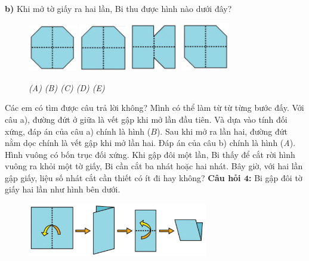 \textbf{\color{toancuabi}b)} Khi mở tờ giấy ra hai lần, Bi thu được hình nào dưới đây?
\begin{figure}[H]
	\centering
	\captionsetup{labelformat=empty}
	\vspace*{-5pt}
	\captionsetup{justification=centering}
	\includegraphics[width =0.19\textwidth]{cat-9a}
	\hfill
	\includegraphics[width =0.19\textwidth]{cat-9b}
	\hfill
	\includegraphics[width =0.19\textwidth]{cat-9c}
	\hfill
	\includegraphics[width =0.19\textwidth]{cat-9d}
	\caption{\small \it (A) \hfill (B) \hfill (C) \hfill (D) \hfill (E)}
\end{figure}
Các em có tìm được câu trả lời không? Mình có thể làm từ từ từng bước đấy. Với câu a), đường đứt ở giữa là vết gập khi mở lần đầu tiên. Và dựa vào tính đối xứng, đáp án của câu a) chính là hình ($B$).
\vskip 0.1cm
Sau khi mở ra lần hai, đường đứt nằm dọc chính là vết gập khi mở lần hai. Đáp án của câu b) chính là hình (\textit{A}).
\vskip 0.1cm
Hình vuông có bốn trục đối xứng. Khi gập đôi một lần, Bi thấy để cắt rời hình vuông ra khỏi một tờ giấy, Bi cần cắt ba nhát hoặc hai nhát. Bây giờ, với hai lần gập giấy, liệu số nhát cắt cần thiết có ít đi hay không?
\vskip 0.1cm
\textbf{\color{toancuabi}Câu hỏi $\pmb{4}$:} Bi gập đôi tờ giấy hai lần như hình bên dưới. 
\begin{figure}[H]
	\captionsetup{labelformat=empty}
	\vspace*{-5pt}
	\centering
	\captionsetup{justification=raggedleft}
	\includegraphics[width =0.7\textwidth]{cat-10}
	\vspace*{-10pt}
\end{figure}
